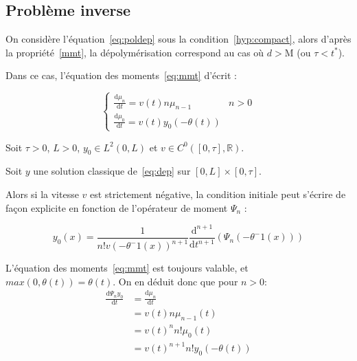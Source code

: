 \documentclass[a4paper]{article}
\newcommand{\mass}{\mathrm{M}}
\newcommand{\dep}{d}
\begin{document}
\subsection{Problème inverse}

On considère l'équation~\eqref{eq:poldep} sous la condition~\eqref{hyp:compact}, 
alors d'après la propriété~\ref{mmt},
la dépolymérisation correspond au cas où $\dep>\mass$ (ou $\tau<t^*$).

Dans ce cas, l'équation des moments~\eqref{eq:mmt} d'écrit :

\begin{equation}
\begin{cases}
\displaystyle \frac{\mathrm{d} \mu_n }{\mathrm{d}t} = v(t) n \mu_{n-1} & n>0 \\
\displaystyle \frac{\mathrm{d} \mu_0 }{\mathrm{d}t} = v(t) y_0(-\theta(t))
\end{cases}
\end{equation}

\begin{proposition}
	Soit $\tau >0$, $L>0$, $y_0 \in L^2(0,L)$ et $v \in C^0([0,\tau],\mathbb{R})$.
	
	Soit $y$ une solution classique de~\eqref{eq:dep} sur $[0,L] \times [0,\tau]$.
	
	Alors si la vitesse $v$ est strictement négative, la condition initiale peut s'écrire de façon explicite 
	en fonction de l'opérateur de moment $\Psi_n$ :
	
	\begin{equation}
		\label{mexplicit}
		y_0(x) = \frac{1}{n! v(-\theta^-1(x))^{n+1}} \frac{\mathrm{d}^{n+1}}{\mathrm{d}t^{n+1}} (\Psi_n(-\theta^-1(x)))
	\end{equation}
\end{proposition}

\begin{preuve}
L'équation des moments~\eqref{eq:mmt} est toujours valable, et $max(0,\theta(t))=\theta(t)$.
On en déduit donc que pour $n>0$:
\[
\begin{split}
	\frac{\mathrm{d} \Psi_n y_0 }{\mathrm{d}t} &= \frac{\mathrm{d} \mu_n }{\mathrm{d}t}\\
	                                      &= v(t) n \mu_{n-1} (t)\\
										  &= v(t)^{n} n! \mu_0(t)\\
										  &= v(t)^{n+1} n!  y_0(-\theta(t))  
\end{split}
\]
\end{preuve}
\end{document}

